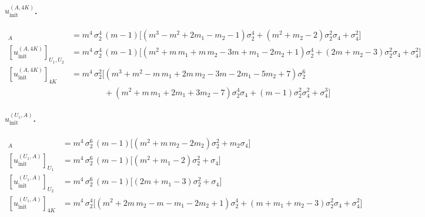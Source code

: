 \documentclass[12pt,a4paper]{article}
\begin{document}
\paragraph{$u^{(A, 4K)}_{\mathrm{init}}$.}
\begin{align*}
[u^{(A, 4K)}_{\mathrm{init}}]_{A}
  &= m^{4}\,\sigma_{2}^{4}\,(m-1)\bigl[
       (m^{3} - m^{2} + 2m_{1} - m_{2} - 1)\sigma_{2}^{4}
       + (m^{2} + m_{2} - 2)\sigma_{2}^{2}\sigma_{4} + \sigma_{4}^{2}\bigr]\\
[u^{(A, 4K)}_{\mathrm{init}}]_{U_{1}, U_{2}}
  &= m^{4}\,\sigma_{2}^{4}\,(m-1)\bigl[
       (m^{2} + m\,m_{1} + m\,m_{2} - 3m + m_{1} - 2m_{2} + 1)\sigma_{2}^{4}
       + (2m + m_{2} - 3)\sigma_{2}^{2}\sigma_{4} + \sigma_{4}^{2}\bigr]\\
[u^{(A, 4K)}_{\mathrm{init}}]_{4K}
  &= m^{4}\,\sigma_{2}^{2}\bigl[
       (m^{3} + m^{2} - m\,m_{1} + 2m\,m_{2} - 3m - 2m_{1} - 5m_{2} + 7)\sigma_{2}^{6}\\
  &\hspace{4em}
       + (m^{2} + m\,m_{1} + 2m_{1} + 3m_{2} - 7)\sigma_{2}^{4}\sigma_{4}
       + (m - 1)\sigma_{2}^{2}\sigma_{4}^{2} + \sigma_{4}^{3}\bigr]
\end{align*}

\paragraph{$u^{(U_{1}, A)}_{\mathrm{init}}$.}
\begin{align*}
[u^{(U_{1}, A)}_{\mathrm{init}}]_{A}
  &= m^{4}\,\sigma_{2}^{6}\,(m-1)\bigl[(m^{2} + m\,m_{2} - 2m_{2})\sigma_{2}^{2} + m_{2}\sigma_{4}\bigr]\\
[u^{(U_{1}, A)}_{\mathrm{init}}]_{U_{1}}
  &= m^{4}\,\sigma_{2}^{6}\,(m-1)\bigl[(m^{2} + m_{1} - 2)\sigma_{2}^{2} + \sigma_{4}\bigr]\\
[u^{(U_{1}, A)}_{\mathrm{init}}]_{U_{2}}
  &= m^{4}\,\sigma_{2}^{6}\,(m-1)\bigl[(2m + m_{1} - 3)\sigma_{2}^{2} + \sigma_{4}\bigr]\\
[u^{(U_{1}, A)}_{\mathrm{init}}]_{4K}
  &= m^{4}\,\sigma_{2}^{4}\bigl[
       (m^{2} + 2m\,m_{2} - m - m_{1} - 2m_{2} + 1)\sigma_{2}^{4}
       + (m + m_{1} + m_{2} - 3)\sigma_{2}^{2}\sigma_{4} + \sigma_{4}^{2}\bigr]
\end{align*}
\end{document}
